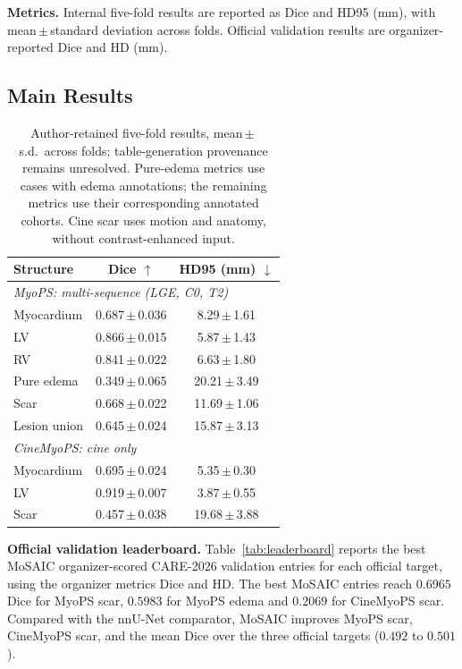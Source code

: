 \documentclass[runningheads]{llncs}
\begin{document}
\noindent\textbf{Metrics.} Internal five-fold results are reported as Dice
and HD95 (mm), with mean\,$\pm$\,standard deviation across folds. Official
validation results are organizer-reported Dice and HD (mm).

\subsection{Main Results}

\begin{table}[t]
\centering
\caption{Author-retained five-fold results, mean\,$\pm$\,s.d.\ across folds;
table-generation provenance remains unresolved. Pure-edema metrics use cases with edema annotations; the remaining
metrics use their corresponding annotated cohorts. Cine scar uses motion and anatomy, without contrast-enhanced input.}
\label{tab:main}
\begin{tabular}{lcc}
\toprule
Structure & Dice $\uparrow$ & HD95 (mm) $\downarrow$ \\
\midrule
\multicolumn{3}{l}{\textit{MyoPS: multi-sequence (LGE, C0, T2)}}\\
\quad Myocardium & 0.687\,{\tiny $\pm$\,0.036} & 8.29\,{\tiny $\pm$\,1.61} \\
\quad LV & 0.866\,{\tiny $\pm$\,0.015} & 5.87\,{\tiny $\pm$\,1.43} \\
\quad RV & 0.841\,{\tiny $\pm$\,0.022} & 6.63\,{\tiny $\pm$\,1.80} \\
\quad Pure edema & 0.349\,{\tiny $\pm$\,0.065} & 20.21\,{\tiny $\pm$\,3.49} \\
\quad Scar & 0.668\,{\tiny $\pm$\,0.022} & 11.69\,{\tiny $\pm$\,1.06} \\
\quad Lesion union & 0.645\,{\tiny $\pm$\,0.024} & 15.87\,{\tiny $\pm$\,3.13} \\
\midrule
\multicolumn{3}{l}{\textit{CineMyoPS: cine only}}\\
\quad Myocardium & 0.695\,{\tiny $\pm$\,0.024} & 5.35\,{\tiny $\pm$\,0.30} \\
\quad LV & 0.919\,{\tiny $\pm$\,0.007} & 3.87\,{\tiny $\pm$\,0.55} \\
\quad Scar & 0.457\,{\tiny $\pm$\,0.038} & 19.68\,{\tiny $\pm$\,3.88} \\
\bottomrule
\end{tabular}
\end{table}

\noindent\textbf{Official validation leaderboard.} Table~\ref{tab:leaderboard}
reports the best MoSAIC organizer-scored CARE-2026 validation entries for each
official target, using the organizer metrics Dice and HD. The best MoSAIC entries
reach $0.6965$ Dice for MyoPS scar, $0.5983$ for MyoPS edema and $0.2069$ for
CineMyoPS scar. Compared with the nnU-Net comparator, MoSAIC improves MyoPS scar,
CineMyoPS scar, and the mean Dice over the three official targets ($0.492$ to
$0.501$).
\end{document}
